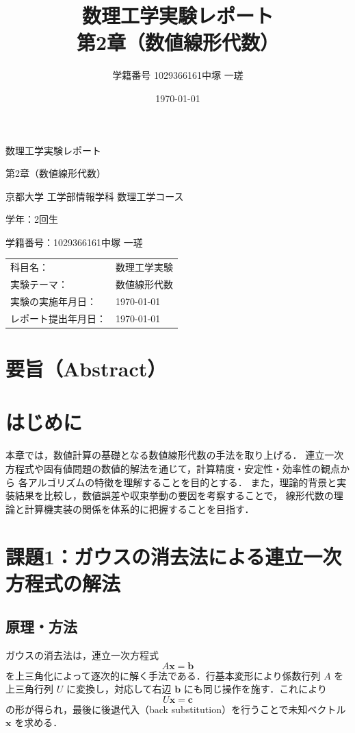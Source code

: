 \documentclass[a4paper,11pt]{ltjsarticle}
\title{数理工学実験レポート\\\vspace{5pt}\large 第2章（数値線形代数）}
\author{学籍番号 1029366161\quad 中塚 一瑳}
\date{\today}
\begin{document}
\begin{titlepage}
\centering
{\Large 数理工学実験レポート\par}
\vspace{4mm}
{\large 第2章（数値線形代数）\par}
\vspace{15mm}
{\large 京都大学 工学部情報学科 数理工学コース\par}
{\large 学年：2回生\par}
{\large 学籍番号：1029366161\quad 中塚 一瑳\par}
\vspace{10mm}
\begin{tabular}{@{}ll}
科目名： & 数理工学実験 \\
実験テーマ： & 数値線形代数 \\
実験の実施年月日： & \today \\
レポート提出年月日： & \today \\
\end{tabular}
\vfill
\end{titlepage}

\section*{要旨（Abstract）}


\section{はじめに}
本章では，数値計算の基礎となる数値線形代数の手法を取り上げる．
連立一次方程式や固有値問題の数値的解法を通じて，計算精度・安定性・効率性の観点から
各アルゴリズムの特徴を理解することを目的とする．
また，理論的背景と実装結果を比較し，数値誤差や収束挙動の要因を考察することで，
線形代数の理論と計算機実装の関係を体系的に把握することを目指す．


\section{課題1：ガウスの消去法による連立一次方程式の解法}

\subsection{原理・方法}
ガウスの消去法は，連立一次方程式
\[
A\boldsymbol{x} = \boldsymbol{b}
\]
を上三角化によって逐次的に解く手法である\cite{exp2025}．行基本変形により係数行列 $A$ を上三角行列 $U$ に変換し，対応して右辺 $\boldsymbol{b}$ にも同じ操作を施す．これにより
\[
U\boldsymbol{x} = \boldsymbol{c}
\]
の形が得られ，最後に後退代入（back substitution）を行うことで未知ベクトル $\boldsymbol{x}$ を求める．
\end{document}
